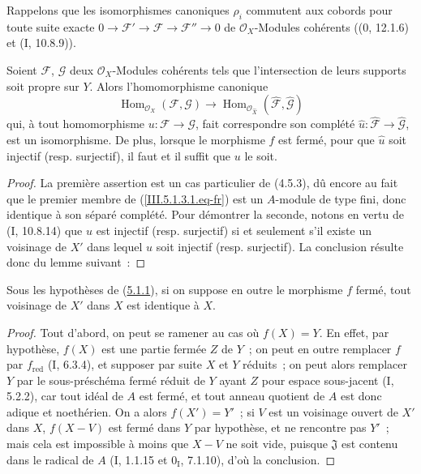 Rappelons que les isomorphismes canoniques $\rho_i$ commutent aux cobords pour
toute suite exacte
$0\to\mathcal F'\to\mathcal F\to\mathcal F''\to0$ de $\mathcal O_X$-Modules
cohérents (($0$, 12.1.6) et (I, 10.8.9)).

\begin{corollary}[5.1.3]
\label{III.5.1.3-fr}
Soient $\mathcal F$, $\mathcal G$ deux $\mathcal O_X$-Modules cohérents tels que
l'intersection de leurs supports soit propre sur $Y$. Alors l'homomorphisme canonique
\begin{equation}
\operatorname{Hom}_{\mathcal O_X}(\mathcal F,\mathcal G)
\longrightarrow
\operatorname{Hom}_{\mathcal O_{\widehat X}}
(\widehat{\mathcal F},\widehat{\mathcal G})
\tag{5.1.3.1}
\label{III.5.1.3.1.eq-fr}
\end{equation}
qui, à tout homomorphisme $u:\mathcal F\to\mathcal G$, fait correspondre son
complété $\widehat u:\widehat{\mathcal F}\to\widehat{\mathcal G}$, est un
isomorphisme. De plus, lorsque le morphisme $f$ est fermé, pour que $\widehat u$ soit
injectif (resp. surjectif), il faut et il suffit que $u$ le soit.
\end{corollary}

\begin{proof}
La première assertion est un cas particulier de (4.5.3), dû encore au fait que le
premier membre de (\ref{III.5.1.3.1.eq-fr}) est un $A$-module de type fini, donc
identique à son séparé complété. Pour démontrer la seconde, notons en vertu de
(I, 10.8.14) que $\widehat u$ est injectif (resp. surjectif) si et seulement s'il existe
un voisinage de $X'$ dans lequel $u$ soit injectif (resp. surjectif). La conclusion
résulte donc du lemme suivant~:
\end{proof}


\begin{lemma}[5.1.3.1]
\label{III.5.1.3.1-fr}
Sous les hypothèses de (\hyperref[III.5.1.1-fr]{5.1.1}), si on suppose en outre le
morphisme $f$ fermé, tout voisinage de $X'$ dans $X$ est identique à $X$.
\end{lemma}

\begin{proof}
Tout d'abord, on peut se ramener au cas où $f(X)=Y$. En effet, par hypothèse,
$f(X)$ est une partie fermée $Z$ de $Y$~; on peut en outre remplacer $f$ par
$f_{\mathrm{red}}$ (I, 6.3.4), et supposer par suite $X$ et $Y$ réduits~; on peut alors
remplacer $Y$ par le sous-préschéma fermé réduit de $Y$ ayant $Z$ pour espace
sous-jacent (I, 5.2.2), car tout idéal de $A$ est fermé, et tout anneau quotient de
$A$ est donc adique et noethérien. On a alors $f(X')=Y'$~; si $V$ est un voisinage
ouvert de $X'$ dans $X$, $f(X-V)$ est fermé dans $Y$ par hypothèse, et ne rencontre
pas $Y'$~; mais cela est impossible à moins que $X-V$ ne soit vide, puisque
$\mathfrak J$ est contenu dans le radical de $A$ (I, 1.1.15 et $0_{\mathrm I}$,
7.1.10), d'où la conclusion.
\end{proof}

